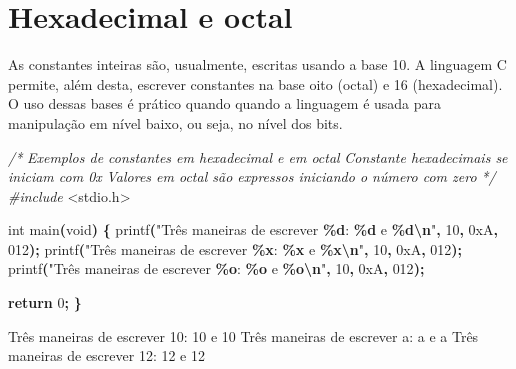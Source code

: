 \documentclass[
  11pt,
  a4paper,
]{scrbook}
\newenvironment{Shaded}{\begin{snugshade}}{\end{snugshade}}
\newcommand{\BaseNTok}[1]{\textcolor[rgb]{0.00,0.00,0.81}{#1}}
\newcommand{\CommentTok}[1]{\textcolor[rgb]{0.56,0.35,0.01}{\textit{#1}}}
\newcommand{\ControlFlowTok}[1]{\textcolor[rgb]{0.13,0.29,0.53}{\textbf{#1}}}
\newcommand{\DataTypeTok}[1]{\textcolor[rgb]{0.13,0.29,0.53}{#1}}
\newcommand{\DecValTok}[1]{\textcolor[rgb]{0.00,0.00,0.81}{#1}}
\newcommand{\ImportTok}[1]{#1}
\newcommand{\NormalTok}[1]{#1}
\newcommand{\OperatorTok}[1]{\textcolor[rgb]{0.81,0.36,0.00}{\textbf{#1}}}
\newcommand{\PreprocessorTok}[1]{\textcolor[rgb]{0.56,0.35,0.01}{\textit{#1}}}
\newcommand{\SpecialCharTok}[1]{\textcolor[rgb]{0.81,0.36,0.00}{\textbf{#1}}}
\newcommand{\StringTok}[1]{\textcolor[rgb]{0.31,0.60,0.02}{#1}}
\begin{document}
\section{Hexadecimal e octal}\label{hexadecimal-e-octal}

As constantes inteiras são, usualmente, escritas usando a base 10. A
linguagem C permite, além desta, escrever constantes na base oito
(octal) e 16 (hexadecimal). O uso dessas bases é prático quando quando a
linguagem é usada para manipulação em nível baixo, ou seja, no nível dos
bits.

\begin{Shaded}
\begin{Highlighting}[]
\CommentTok{/*}
\CommentTok{Exemplos de constantes em hexadecimal e em octal}
\CommentTok{Constante hexadecimais se iniciam com 0x}
\CommentTok{Valores em octal são expressos iniciando o número com zero}
\CommentTok{*/}
\PreprocessorTok{\#include }\ImportTok{\textless{}stdio.h\textgreater{}}

\DataTypeTok{int}\NormalTok{ main}\OperatorTok{(}\DataTypeTok{void}\OperatorTok{)} \OperatorTok{\{}
\NormalTok{    printf}\OperatorTok{(}\StringTok{"Três maneiras de escrever }\SpecialCharTok{\%d}\StringTok{: }\SpecialCharTok{\%d}\StringTok{ e }\SpecialCharTok{\%d\textbackslash{}n}\StringTok{"}\OperatorTok{,} \DecValTok{10}\OperatorTok{,} \BaseNTok{0xA}\OperatorTok{,} \BaseNTok{012}\OperatorTok{);}
\NormalTok{    printf}\OperatorTok{(}\StringTok{"Três maneiras de escrever }\SpecialCharTok{\%x}\StringTok{: }\SpecialCharTok{\%x}\StringTok{ e }\SpecialCharTok{\%x\textbackslash{}n}\StringTok{"}\OperatorTok{,} \DecValTok{10}\OperatorTok{,} \BaseNTok{0xA}\OperatorTok{,} \BaseNTok{012}\OperatorTok{);}
\NormalTok{    printf}\OperatorTok{(}\StringTok{"Três maneiras de escrever }\SpecialCharTok{\%o}\StringTok{: }\SpecialCharTok{\%o}\StringTok{ e }\SpecialCharTok{\%o\textbackslash{}n}\StringTok{"}\OperatorTok{,} \DecValTok{10}\OperatorTok{,} \BaseNTok{0xA}\OperatorTok{,} \BaseNTok{012}\OperatorTok{);}

    \ControlFlowTok{return} \DecValTok{0}\OperatorTok{;}
\OperatorTok{\}}
\end{Highlighting}
\end{Shaded}

\begin{Shaded}
\begin{Highlighting}[]
\NormalTok{Três maneiras de escrever 10: 10 e 10}
\NormalTok{Três maneiras de escrever a: a e a}
\NormalTok{Três maneiras de escrever 12: 12 e 12}
\end{Highlighting}
\end{Shaded}
\end{document}
